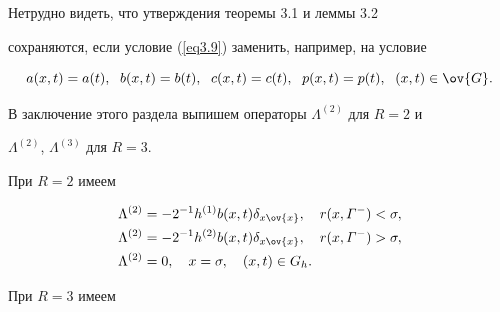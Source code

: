 Нетрудно видеть, что утверждения теоремы 3.1 и леммы 3.2


сохраняются, если условие (\ref{eq3.9}) заменить, например, на условие


$$


a(x,t)=a(t),\ \; b(x,t)=b(t),\ \; c(x,t)=c(t),\ \;


p(x,t)=p(t),\ \; (x,t)\in\ov{G}.


$$





В заключение этого раздела выпишем операторы $\Lambda^{(2)}$ для $R=2$ и


$\Lambda^{(2)}$, $\Lambda^{(3)}$ для $R=3$.


При $R=2$ имеем


\begin{equation}


\label{eq4.11}


\begin{split}


\Lambda^{(2)}&=-2^{-1}h^{(1)}b(x,t)\delta_{x\ov{x}},


\quad r(x,\varGamma^{-})<\sigma,\\


\Lambda^{(2)}&=-2^{-1}h^{(2)}b(x,t)\delta_{x\ov{x}},


\quad r(x,\varGamma^{-})>\sigma,\\


\Lambda^{(2)}&=0,\quad x=\sigma, \quad (x,t)\in G_h. \\


\end{split}


\end{equation}


При $R=3$ имеем


